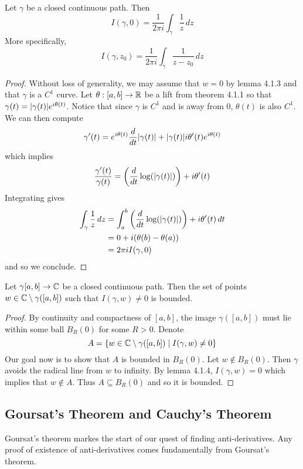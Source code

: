 \documentclass[a4paper]{article}
\begin{document}
\begin{thm}{}{} Let $\gamma$ be a closed continuous path. Then $$I(\gamma,0)=\frac{1}{2\pi i}\int_{\gamma}\frac{1}{z}\,dz$$ More specifically, $$I(\gamma,z_0)=\frac{1}{2\pi i}\int_{\gamma}\frac{1}{z-z_0}\,dz$$ \tcbline
\begin{proof}
Without loss of generality, we may assume that $w=0$ by lemma 4.1.3 and that $\gamma$ is a $C^1$ curve. Let $\theta:[a,b]\to\mathbb{R}$ be a lift from theorem 4.1.1 so that $\gamma(t)=\abs{\gamma(t)}e^{i\theta(t)}$. Notice that since $\gamma$ is $C^1$ and is away from $0$, $\theta(t)$ is also $C^1$. We can then compute $$\gamma'(t)=e^{i\theta(t)}\frac{d}{dt}\abs{\gamma(t)}+\abs{\gamma(t)}i\theta'(t)e^{i\theta(t)}$$ which implies $$\frac{\gamma'(t)}{\gamma(t)}=\left(\frac{d}{dt}\log(\abs{\gamma(t)})\right)+i\theta'(t)$$ Integrating gives 
\begin{align*}
\int_\gamma\frac{1}{z}\,dz&=\int_a^b\left(\frac{d}{dt}\log(\abs{\gamma(t)})\right)+i\theta'(t)\,dt\\
&=0+i(\theta(b)-\theta(a))\\
&=2\pi iI(\gamma,0)
\end{align*}
and so we conclude. 
\end{proof}
\end{thm}

\begin{prp}{}{} Let $\gamma[a,b]\to\mathbb{C}$ be a closed continuous path. Then the set of points $w\in\mathbb{C}\setminus\gamma([a,b])$ such that $I(\gamma,w)\neq 0$ is bounded. \tcbline
\begin{proof}
By continuity and compactness of $[a,b]$, the image $\gamma([a,b])$ must lie within some ball $B_R(0)$ for some $R>0$. Denote $$A=\{w\in\mathbb{C}\setminus\gamma([a,b])\;|\;I(\gamma,w)\neq 0\}$$ Our goal now is to show that $A$ is bounded in $B_R(0)$. Let $w\notin B_R(0)$. Then $\gamma$ avoids the radical line from $w$ to infinity. By lemma 4.1.4, $I(\gamma,w)=0$ which implies that $w\notin A$. Thus $A\subseteq B_R(0)$ and so it is bounded. 
\end{proof}
\end{prp}

\subsection{Goursat's Theorem and Cauchy's Theorem}
Goursat's theorem markes the start of our quest of finding anti-derivatives. Any proof of existence of anti-derivatives comes fundamentally from Goursat's theorem. 
\end{document}

